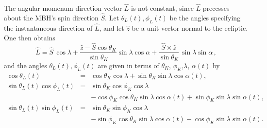 \documentclass[12pt]{iopart}
\def\be{\begin{equation}}
\def\ee{\end{equation}}
\begin{document}
The angular momenum direction vector $\hat L$ is not constant, since $\hat L$ precesses about the MBH's spin
direction $\hat S$.  Let $\theta_L(t),\phi_L(t)$ be the angles specifying the instantaneous direction of $\hat L$, and let $\hat z$ be a unit vector normal to the ecliptic. One then obtains
\be \label{alpha}
\hat L = \hat S \, \cos\lambda +
\frac{\hat z - \hat S \cos\theta_K}{\sin\theta_K} \sin\lambda \cos\alpha
+ \frac{\hat S \times \hat z}{\sin\theta_K}  \, \sin\lambda \sin\alpha\,,
\ee
\noindent
and the angles $\theta_L(t),\phi_L(t)$ are given in terms of $\theta_K$, $\phi_K$,$\lambda$, $\alpha(t)$ by
\begin{eqnarray}\label{relations3}
\cos\theta_L(t) &=& \cos\theta_K \cos\lambda
    +\sin\theta_K\sin\lambda\cos\alpha(t), \nonumber\\
\sin\theta_L(t)\cos\phi_L(t) &=&
\sin\theta_K\cos\phi_K\cos\lambda \nonumber \\
& & -\cos\phi_K\cos\theta_K\sin\lambda\cos\alpha(t)
+\sin\phi_K\sin\lambda\sin\alpha(t),  \nonumber\\
\sin\theta_L(t)\sin\phi_L(t) &=&
\sin\theta_K\sin\phi_K\cos\lambda \nonumber \\
& & -\sin\phi_K\cos\theta_K\sin\lambda\cos\alpha(t)
-\cos\phi_K\sin\lambda\sin\alpha(t) .
\end{eqnarray}
\end{document}
